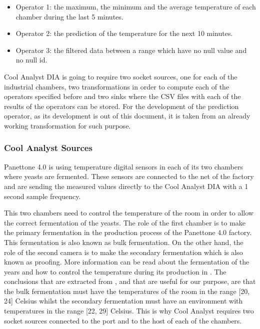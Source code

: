 \begin{itemize}
\item Operator 1: the maximum, the minimum and the average temperature of each chamber during the last 5 minutes.
\item Operator 2: the prediction of the temperature for the next 10 minutes.
\item Operator 3: the filtered data between a range which have no null value and no null id.
\end{itemize}

Cool Analyst DIA is going to require two socket sources, one for each of the industrial chambers, two transformations in order to compute each of the operators specified before and two sinks where the CSV files with each of the results of the operators can be stored. For the development of the prediction operator, as its development is out of this document, it is taken from an already working transformation for such purpose.

\subsubsection*{Cool Analyst Sources}

Panettone 4.0 is using temperature digital sensors in each of its two chambers where yeasts are fermented. These sensors are connected to the net of the factory and are sending the measured values directly to the Cool Analyst DIA with a 1 second sample frequency.

This two chambers need to control the temperature of the room in order to allow the correct fermentation of the yeasts. The role of the first chamber is to make the primary fermentation in the production process of the Panettone 4.0 factory. This fermentation is also known as bulk fermentation. On the other hand, the role of the second camera is to make the secondary fermentation which is also known as proofing. More information can be read about the fermentation of the years and how to control the temperature during its production in \cite{yeastfermentation}. The conclusions that are extracted from \cite{yeastfermentation}, and that are useful for our purpose, are that the bulk fermentation must have the temperatures of the room in the range [20, 24] Celsius whilst the secondary fermentation must have an environment with temperatures in the range [22, 29] Celsius. This is why Cool Analyst requires two socket sources connected to the port and to the host of each of the chambers.

